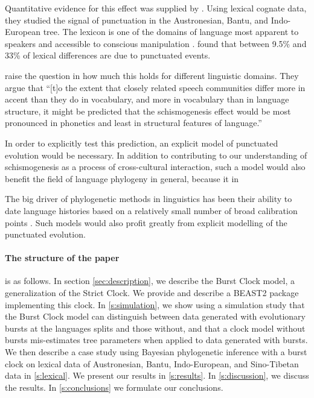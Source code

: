 \documentclass[a4paper,12pt]{scrartcl}
\begin{document}
Quantitative evidence for this effect was supplied by
\textcite{atkinson2008languages}. Using lexical cognate data, they studied the
signal of punctuation in the Austronesian, Bantu, and Indo-European tree. The
lexicon is one of the domains of language most apparent to speakers and
accessible to conscious manipulation \textcite{}.
 found that between 9.5\% and 33\% of lexical
differences are due to punctuated events.



\Textcite{gray2013three} raise the question in how much this holds for
different linguistic domains. They argue that “[t]o the extent that closely
related speech communities differ more in accent than they do in vocabulary, and
more in vocabulary than in language structure, it might be predicted that the
schismogenesis effect would be most pronounced in phonetics and least in
structural features of language.”

In order to explicitly test this prediction, an explicit model of punctuated
evolution would be necessary. In addition to contributing to our understanding
of schismogenesis as a process of cross-cultural interaction, such a model would
also benefit the field of language phylogeny in general, because it in

The big driver of phylogenetic methods in linguistics has been their ability to
date language histories based on a relatively small number of broad calibration
points \parencite{}. Such models would also profit greatly from explicit
modelling of the punctuated evolution.

\paragraph{The structure of the paper} is as follows. In section
\cref{sec:description}, we describe the Burst Clock model, a generalization of
the Strict Clock. We provide and describe a BEAST2 \parencite{beast2} package
implementing this clock. In \cref{s:simulation}, we show using a simulation
study that the Burst Clock model can distinguish between data generated with
evolutionary bursts at the languages splits and those without, and that
a clock model without bursts mis-estimates tree parameters when applied to data
generated with bursts.
We then describe a case study using Bayesian phylogenetic inference
with a burst clock on
lexical data of Austronesian, Bantu, Indo-European, and Sino-Tibetan data in
\cref{s:lexical}.
We present our results in
\cref{s:results}. In \cref{s:discussion}, we discuss the results. In
\cref{s:conclusions} we formulate our conclusions.
\end{document}
